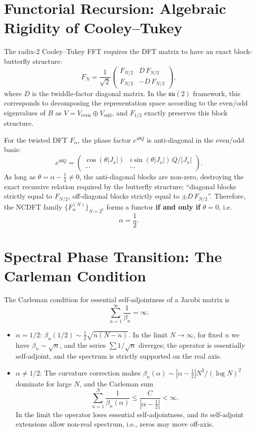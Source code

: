 \documentclass[12pt,a4paper]{amsart}
\theoremstyle{plain}
\theoremstyle{definition}
\theoremstyle{remark}
\begin{document}
\section{Functorial Recursion: Algebraic Rigidity of Cooley--Tukey}

The radix-2 Cooley--Tukey FFT requires the DFT matrix to have an exact block-butterfly structure:
\[
F_N=\frac{1}{\sqrt2}\begin{pmatrix} F_{N/2} & D\,F_{N/2} \\ F_{N/2} & -D\,F_{N/2} \end{pmatrix},
\]
where $D$ is the twiddle-factor diagonal matrix. In the $\mathfrak{su}(2)$ framework, this corresponds to decomposing the representation space according to the even/odd eigenvalues of $B$ as $V=V_{\mathrm{even}}\oplus V_{\mathrm{odd}}$, and $F_{1/2}$ exactly preserves this block structure.

For the twisted DFT $F_\alpha$, the phase factor $e^{i\theta Q}$ is anti-diagonal in the even/odd basis:
\[
e^{i\theta Q}=\begin{pmatrix} \cos(\theta|J_x|) & i\sin(\theta|J_x|)\,Q/|J_x| \\ \cdots & \cdots \end{pmatrix}.
\]
As long as $\theta=\alpha-\frac12\neq 0$, the anti-diagonal blocks are non-zero, destroying the exact recursive relation required by the butterfly structure: ``diagonal blocks strictly equal to $F_{N/2}$, off-diagonal blocks strictly equal to $\pm D\,F_{N/2}$''. Therefore, the NCDFT family $\{F_\alpha^{(N)}\}_{N=2^k}$ forms a functor \textbf{if and only if} $\theta=0$, i.e.
\[
\alpha=\frac12.
\]

\section{Spectral Phase Transition: The Carleman Condition}

The Carleman condition for essential self-adjointness of a Jacobi matrix is
\[
\sum_{n=1}^{\infty}\frac{1}{\beta_n}=\infty.
\]
\begin{itemize}
\item \textbf{$\alpha=1/2$}: $\beta_n(1/2)\sim\frac12\sqrt{n(N-n)}$. In the limit $N\to\infty$, for fixed $n$ we have $\beta_n\sim\sqrt{n}$, and the series $\sum 1/\sqrt{n}$ diverges; the operator is essentially self-adjoint, and the spectrum is strictly supported on the real axis.
\item \textbf{$\alpha\neq 1/2$}: The curvature correction makes $\beta_n(\alpha)\sim|\alpha-\frac12|N^2/(\log N)^2$ dominate for large $N$, and the Carleman sum
\[
\sum_{n=1}^{N}\frac{1}{\beta_n(\alpha)}\leq\frac{C}{|\alpha-\frac12|}<\infty.
\]
In the limit the operator loses essential self-adjointness, and its self-adjoint extensions allow non-real spectrum, i.e., zeros may move off-axis.
\end{itemize}
\end{document}
